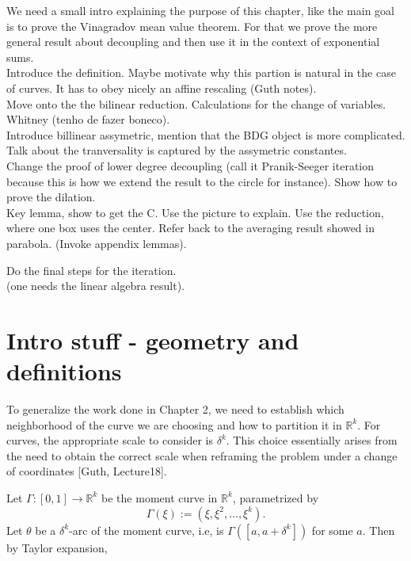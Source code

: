 We need a small intro explaining the purpose of this chapter, like the main goal is to prove the Vinagradov mean value theorem. 
For that we prove the more general result about decoupling and then use it in the context of exponential sums.\\

Introduce the definition. Maybe motivate why this partion is natural in the case of curves. It has to obey nicely an affine rescaling (Guth notes). \\

Move onto the the bilinear reduction. Calculations for the change of variables.  Whitney (tenho de fazer boneco). \\

Introduce billinear assymetric, mention that the BDG object is more complicated. Talk about the tranversality is captured by the assymetric constantes.\\

Change the proof of lower degree decoupling (call it Pranik-Seeger iteration because this is how we extend the result to the circle for instance). Show how to prove the dilation.\\ 

Key lemma, show to get the C. Use the picture to explain. Use the reduction, where one box uses the center. Refer back to the averaging result showed in parabola. (Invoke appendix lemmas). 

Do the final steps for the iteration.\\

(one needs the linear algebra result).
\newpage
\section{Intro stuff - geometry and definitions}
To generalize the work done in Chapter 2, we need to establish which neighborhood of the curve we are choosing and how to partition it in \(\mathbb{R}^k\). For curves, the appropriate scale to consider is \(\delta^k\). This choice essentially arises from the need to obtain the correct scale when reframing the problem under a change of coordinates [Guth, Lecture18].


Let $\Gamma:[0,1] \rightarrow \mathbb{R}^{k}$ be the moment curve in $\mathbb{R}^{k}$, parametrized by 
$$
\Gamma(\xi):=\left(\xi, \xi^{2}, \ldots, \xi^{k}\right).
$$
Let $\theta$ be a $\delta^k$-arc of the moment curve, i.e, is $\Gamma([a,a+\delta^k])$ for some $a$. Then by Taylor expansion, 


